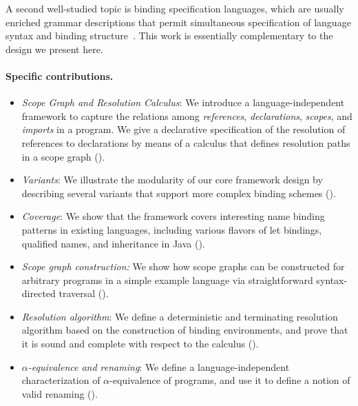 A second well-studied topic is binding specification languages, 
which are usually enriched grammar descriptions that permit simultaneous 
specification of language syntax and binding
structure~\cite{SewellNOPRSS10,DybvigHB92,HermanW08,StansiferW14,WeirichYS11}.
This work is essentially complementary to the design we present here. 

\paragraph{Specific contributions.}\label{contributions}

\begin{itemize}
  
 \item \emph{Scope Graph and Resolution Calculus}: We introduce a
 language-independent framework to capture the relations among
 \emph{references}, \emph{declarations}, \emph{scopes}, and  \emph{imports} in a
 program. 
We give a declarative specification of the resolution of
 references to declarations by means of a calculus that defines resolution paths
 in a scope graph ().

 \item \emph{Variants}: We illustrate the modularity of our core framework design
by describing several variants that support more complex binding 
schemes ().

 \item \emph{Coverage}: We show that the framework covers interesting  name
 binding patterns in existing languages, including various flavors of let bindings,
 qualified names, and inheritance in Java ().
  
 \item \emph{Scope graph construction:} We show how scope graphs can be constructed
 for arbitrary programs in a simple example language via straightforward syntax-directed traversal ().

 \item \emph{Resolution algorithm}: We define a deterministic and terminating
 resolution algorithm based on the construction of binding environments, and
 prove that it is sound and complete with respect to the calculus
 ().
 
 \item \emph{$\alpha$-equivalence and renaming}: We define a language-independent
 characterization of $\alpha$-equivalence of programs, and use it to define a 
 notion of valid renaming ().

\end{itemize}

